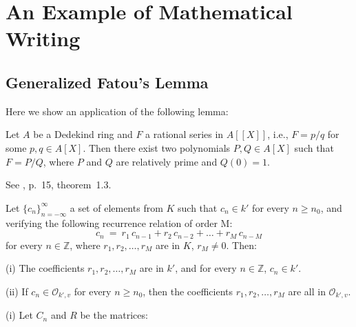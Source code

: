 \chapter{An Example of Mathematical Writing}
%

\section{Generalized Fatou's Lemma}
%

Here we show an application of the following lemma:

\begin{lem} \label{l:fatou}

Let $A$ be a Dedekind ring and $F$ a rational series 
in $A[[X]]$, i.e., $F = p/q$ for some 
$p, q \in A[X]$. Then there exist two polynomials 
$P, Q \in A[X]$ such that $F = P/Q$, 
where $P$ and $Q$ are relatively prime and 
$Q(0) = 1$.

\end{lem}

\proof
See \cite{bertin:psn}, p.~15, theorem~1.3.
\endproof

\begin{thm} \label{l:req}
Let $\{c_n\}_{n=-\infty}^{\infty}$ a set of 
elements from $K$ such that $c_n \in k'$ for every 
$n \geq n_0$, and verifying the following recurrence 
relation of order M:
\begin{equation}
c_n\ =\ r_1\,c_{n-1} + r_2\,c_{n-2} + \dots + r_M\,c_{n-M}
\end{equation}
for every $n \in \mathbb Z$, where $r_1,r_2,\dots,r_M$ are in 
$K$, $r_M \neq 0$. 
Then:

\item{(i)} The coefficients $r_1,r_2,\dots,r_M$ are in 
$k'$, and for every $n \in \mathbb Z$, $c_n \in k'$.

\item{(ii)} If $c_n \in \mathcal O_{k',v}$ 
for every $n \geq n_0$, then the coefficients 
$r_1,r_2,\dots,r_M$ are all in 
$\mathcal O_{k',v}$.

\end{thm}


\proof 

\item{(i)} Let $C_n$ and $R$ be the matrices:

